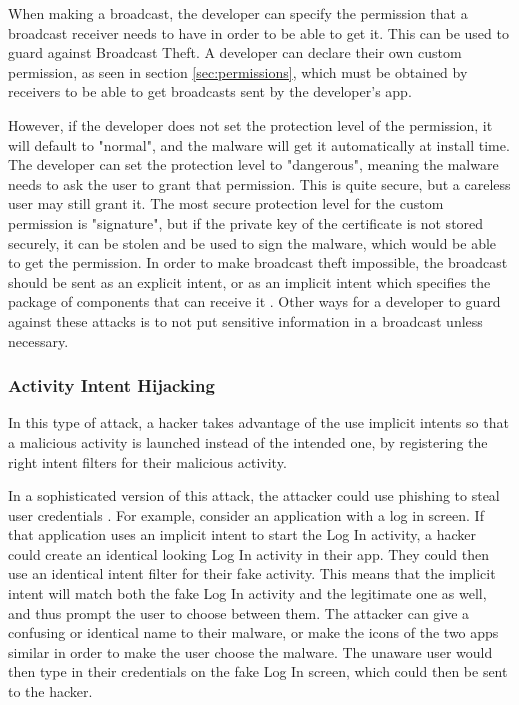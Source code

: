     When making a broadcast, the developer can specify the permission that a broadcast receiver needs to have in order to be able to get it. This can be used to guard against Broadcast Theft. A developer can declare their own custom permission, as seen in section \ref{sec:permissions}, which must be obtained by receivers to be able to get broadcasts sent by the developer's app. 
    
    However, if the developer does not set the protection level of the permission, it will default to "normal", and the malware will get it automatically at install time. The developer can set the protection level to "dangerous", meaning the malware needs to ask the user to grant that permission. This is quite secure, but a careless user may still grant it. The most secure protection level for the custom permission is "signature", but if the private key of the certificate is not stored securely, it can be stolen and be used to sign the malware, which would be able to get the permission. In order to make broadcast theft impossible, the broadcast should be sent as an explicit intent, or as an implicit intent which specifies the package of components that can receive it \cite{2010_icc_paper}. Other ways for a developer to guard against these attacks is to not put sensitive information in a broadcast unless necessary.
    
    \subsubsection{Activity Intent Hijacking}
        \label{subsubsec:activity_hijacking}
        
    In this type of attack, a hacker takes advantage of the use implicit intents so that a malicious activity is launched instead of the intended one, by registering the right intent filters for their malicious activity.
    
    In a sophisticated version of this attack, the attacker could use phishing to steal user credentials \cite{2010_icc_paper}. For example, consider an application with a log in screen. If that application uses an implicit intent to start the Log In activity, a hacker could create an identical looking Log In activity in their app. They could then use an identical intent filter for their fake activity. This means that the implicit intent will match both the fake Log In activity and the legitimate one as well, and thus prompt the user to choose between them. The attacker can give a confusing or identical name to their malware, or make the icons of the two apps similar in order to make the user choose the malware. The unaware user would then type in their credentials on the fake Log In screen, which could then be sent to the hacker.
    
